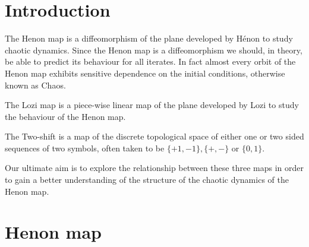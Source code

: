 \documentclass{amsart}
\begin{document}
\section{Introduction}

The Henon map is a diffeomorphism of the plane developed by H\'enon to study chaotic dynamics. Since the Henon map is a diffeomorphism we should, in theory, be able to predict its behaviour for all iterates. In fact almost every orbit of the Henon map exhibits sensitive dependence on the initial conditions, otherwise known as Chaos.

The Lozi map is a piece-wise linear map of the plane developed by Lozi to study the behaviour of the Henon map.

The Two-shift is a map of the discrete topological space of either one or two sided sequences of two symbols, often taken to be $\{+1, -1\}, \{+, -\}$ or $\{0, 1\}$.

Our ultimate aim is to explore the relationship between these three maps in order to gain a better understanding of the structure of the chaotic dynamics of the Henon map.

\section{Henon map}
\end{document}
